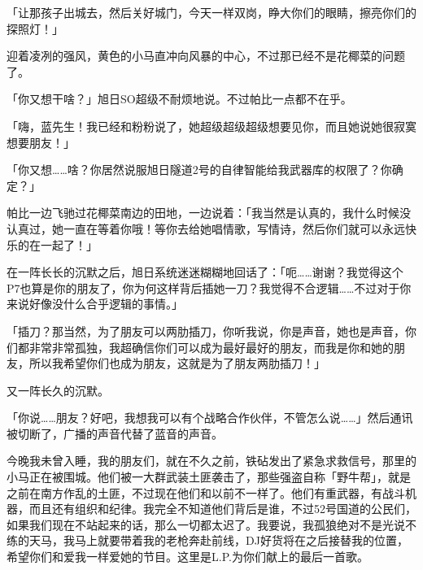 「让那孩子出城去，然后关好城门，今天一样双岗，睁大你们的眼睛，擦亮你们的探照灯！」

迎着凌冽的强风，黄色的小马直冲向风暴的中心，不过那已经不是花椰菜的问题了。

\horizonline


「你又想干啥？」旭日SO超级不耐烦地说。不过帕比一点都不在乎。

「嗨，蓝先生！我已经和粉粉说了，她超级超级超级想要见你，而且她说她很寂寞想要朋友！」

「你又想……啥？你居然说服旭日隧道2号的自律智能给我武器库的权限了？你确定？」

帕比一边飞驰过花椰菜南边的田地，一边说着：「我当然是认真的，我什么时候没认真过，她一直在等着你哦！等你去给她唱情歌，写情诗，然后你们就可以永远快乐的在一起了！」

在一阵长长的沉默之后，旭日系统迷迷糊糊地回话了：「呃……谢谢？我觉得这个P7也算是你的朋友了，你为何这样背后插她一刀？我觉得不合逻辑……不过对于你来说好像没什么合乎逻辑的事情。」

「插刀？那当然，为了朋友可以两肋插刀，你听我说，你是声音，她也是声音，你们都非常非常孤独，我超确信你们可以成为最好最好的朋友，而我是你和她的朋友，所以我希望你们也成为朋友，这就是为了朋友两肋插刀！」

又一阵长久的沉默。

「你说……朋友？好吧，我想我可以有个战略合作伙伴，不管怎么说……」然后通讯被切断了，广播的声音代替了蓝音的声音。

{\rt 今晚我未曾入睡，我的朋友们，就在不久之前，铁砧发出了紧急求救信号，那里的小马正在被围城。他们被一大群武装土匪袭击了，那些强盗自称「野牛帮」，就是之前在南方作乱的土匪，不过现在他们和以前不一样了。他们有重武器，有战斗机器，而且还有组织和纪律。我完全不知道他们背后是谁，不过52号国道的公民们，如果我们现在不站起来的话，那么一切都太迟了。我要说，我孤狼绝对不是光说不练的天马，我马上就要带着我的老枪奔赴前线，DJ好货将在之后接替我的位置，希望你们和爱我一样爱她的节目。这里是L.P.为你们献上的最后一首歌。}


